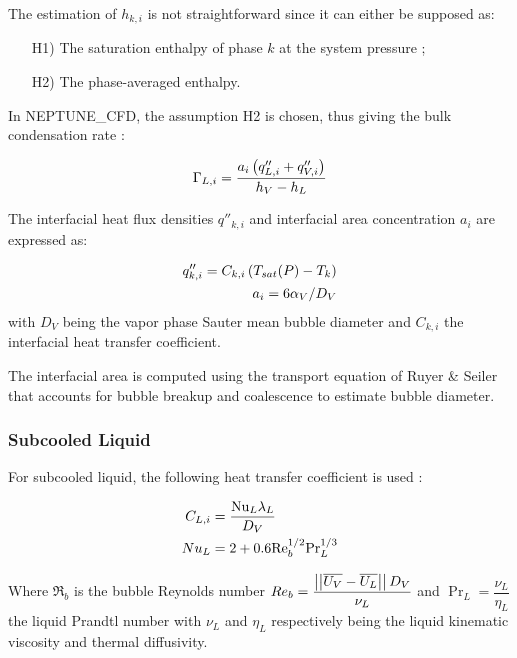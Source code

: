 The estimation of $h_{k,i}$ is not straightforward since it can either be supposed as:

\begin{enumerate}
\item[H1)] The saturation enthalpy of phase $k$ at the system pressure ;
\item[H2)] The phase-averaged enthalpy.
\end{enumerate}

\npar
In NEPTUNE\_CFD, the assumption H2 is chosen, thus giving the bulk condensation rate :

\begin{equation}
\Gamma_{L,i}=\frac{a_{i}\left( q''_{L,i}+q''_{V,i} \right)}{h_{V}-h_{L}}
\label{eq:ncfd_cond_rate}
\end{equation}


The interfacial heat flux densities $q''_{k,i}$ and interfacial area concentration $a_{i}$ are expressed as:

\begin{align}
q''_{k,i}=C_{k,i}\left( T_{sat}(P)-T_{k} \right)\\
a_{i}=6 \alpha_{V}/D_{V}
\end{align}
with $D_{V}$ being the vapor phase Sauter mean bubble diameter and $C_{k,i}$ the interfacial heat transfer coefficient.

\npar

\begin{note*}{}
The interfacial area is computed using the transport equation of {Ruyer} \& {Seiler} \cite{ruyer_modelisation_2009} that accounts for bubble breakup and coalescence to estimate bubble diameter.
\end{note*}


\subsubsection{Subcooled Liquid}

For subcooled liquid, the following heat transfer coefficient is used \cite{ranz_evaporation_1952, manon_contribution_2000}:

\begin{align}
C_{L,i}&=\frac{\Nu_{L}\lambda_{L}}{D_{V}}\\
%
Nu_{L}&=2+0.6\Re_{b}^{1/2}\Pr_{L}^{1/3}
\label{eq:ncfd_subcooled_L}
\end{align}

Where $\Re_{b}$ is the bubble Reynolds number $Re_{b}=\dfrac{\left|\left|{\overline{U_{V}}-\overline{U_{L}}}\right|\right|D_{V} }{\nu_{L}}$ and $\Pr_{L}=\dfrac{\nu_{L}}{\eta_{L}}$ the liquid Prandtl number with $\nu_{L}$ and $\eta_{L}$ respectively being the liquid kinematic viscosity and thermal diffusivity.

